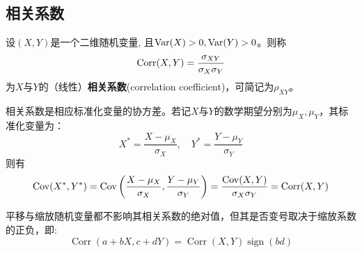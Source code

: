 \subsection{相关系数}

\begin{definition}
    设$(X,Y)$是一个二维随机变量, 且$\operatorname{Var}(X)>0,\operatorname{Var}(Y)>0$。则称
    \[ \operatorname{Corr}(X,Y)=\frac{\sigma_{XY}}{\sigma_X\sigma_Y} \]
    为$X$与$Y$的（线性）\textbf{相关系数}(correlation coefficient)，可简记为$\rho_{XY}$。
\end{definition}


相关系数是相应标准化变量的协方差。若记$X$与$Y$的数学期望分别为$\mu_X,\mu_Y$，其标准化变量为：
\[ X^*=\frac{X-\mu_X}{\sigma_X},\quad Y^*=\frac{Y-\mu_Y}{\sigma_Y} \]
则有
\[ \operatorname{Cov}(X^*, Y^*)=\operatorname{Cov}\left(\frac{X-\mu_X}{\sigma_X}, \frac{Y-\mu_Y}{\sigma_Y}\right)=\frac{\operatorname{Cov}(X, Y)}{\sigma_X\sigma_Y}=\operatorname{Corr}(X, Y) \]

\begin{proposition}
    平移与缩放随机变量都不影响其相关系数的绝对值，但其是否变号取决于缩放系数的正负，即:
    \[ \operatorname{Corr}(a+ b X,c +d Y)  = \operatorname{Corr}(X,Y) \operatorname{sign}(b d) \]
\end{proposition}

